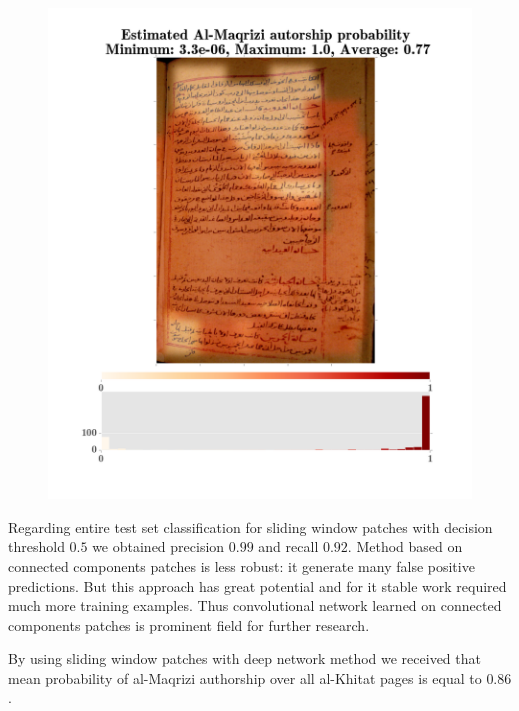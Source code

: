 \documentclass[conference,a4paper,twocolumn]{IEEEtran}
\begin{document}
\begin{figure}
\begin{minipage}{.48\linewidth}
  \includegraphics[width=\linewidth]{figures/hitat_15.png}
\end{minipage}
	\label{fig:al_maqrizi_classification_example}
\end{figure}

Regarding entire test set classification for sliding window patches with decision threshold $0.5$ we obtained precision $0.99$ and recall $0.92$. Method based on connected components patches is less robust: it generate many false positive predictions. But this approach has great potential and for it stable work required much more training examples. Thus convolutional network learned on connected components patches is prominent field for further research.

By using sliding window patches with deep network method we received that mean probability of al-Maqrizi authorship over all al-Khitat pages is equal to $0.86$.    
\end{document}
